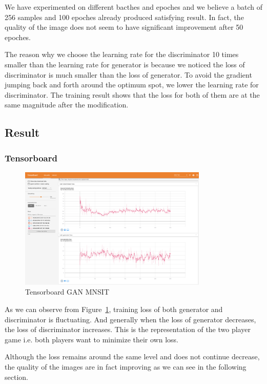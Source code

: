 \documentclass{article}
\begin{document}
We have experimented on different bacthes and epoches and we believe a batch of 256 samples and 100 epoches already produced satisfying result. 
In fact, the quality of the image does not seem to have significant improvement after 50 epoches.

The reason why we choose the learning rate for the discriminator 10 times smaller than the learning rate for generator is 
because we noticed the loss of discriminator is much smaller than the loss of generator. 
To avoid the gradient jumping back and forth around the optimum spot, we lower the learning rate for discriminator.
The training result shows that the loss for both of them are at the same magnitude after the modification.

\subsection{Result}

\subsubsection{Tensorboard}

\begin{figure}[!htb]
  \centering
  \includegraphics[width=0.8\textwidth]{tensorboard-GAN-MNIST.png}
  \caption{Tensorboard GAN MNSIT}
  \label{fig:TB_GAN_MNSIT}
\end{figure}

As we can observe from Figure~\ref{fig:TB_GAN_MNSIT}, training loss of both generator and discriminator is fluctuating. 
And generally when the loss of generator decreases, the loss of discriminator increases. This is the representation of the two player game i.e. both players want to minimize their own loss.

Although the loss remains around the same level and does not continue decrease, the quality of the images are in fact improving as we can see in the following section.
\end{document}
